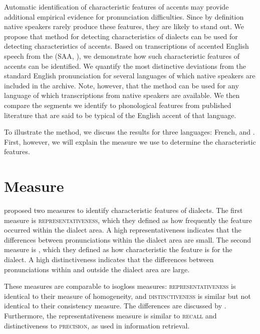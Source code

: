\documentclass[output=paper]{LSP/langsci}
\begin{document}
Automatic identification of characteristic features of accents may provide additional empirical evidence for pronunciation difficulties. Since by definition native speakers rarely produce these features, they are likely to stand out. We propose that  method for detecting characteristics of dialects can be used for detecting characteristics of accents. Based on transcriptions of accented English speech from the  (SAA, \citealt{weinberger_speech_2011}), we demonstrate how such characteristic features of accents can be identified. We quantify the most distinctive deviations from the standard English pronunciation for several languages of which native speakers are included in the archive. Note, however, that the method can be used for any language of which transcriptions from native speakers are available. We then compare the segments we identify to phonological features from published literature that are said to be typical of the English accent of that language.

To illustrate the method, we discuss the results for three languages: French,  and . First, however, we will explain the measure we use to determine the characteristic features.

\section{Measure}
\label{s:measure}
\citet{wieling_bipartite_2011} proposed two measures to identify characteristic features of dialects. The first measure is \textsc{representativeness}, which they defined as how frequently the feature occurred within the dialect area. A high representativeness  indicates that the differences between pronunciations within the dialect area are small. The second measure is \textsc{}, which they defined as how characteristic the feature is for the dialect. A high distinctiveness indicates that the differences between pronunciations within and outside the dialect area are large. 

\largerpage
These measures are comparable to  isogloss measures: \textsc{representativeness} is identical to their measure of homogeneity, and \textsc{distinctiveness} is similar but not identical to their consistency measure. The differences are discussed by \citet{wieling_analyzing_2014}. Furthermore, the representativeness measure is similar to \textsc{recall} and distinctiveness to \textsc{precision}, as used in information retrieval.
\end{document}
